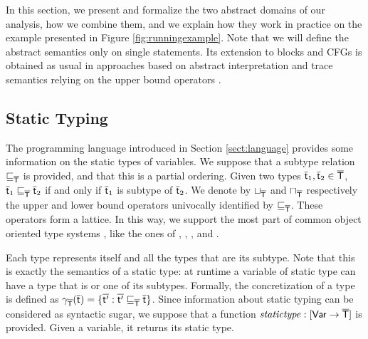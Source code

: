 \documentclass{llncs}
\begin{document}
In this section, we present and formalize the two abstract domains of our analysis, how we combine them, and we explain how they work in practice on the example presented in Figure \ref{fig:runningexample}. Note that we will define the abstract semantics only on single statements. Its extension to blocks and CFGs is obtained as usual in approaches based on abstract interpretation and trace semantics relying on the upper bound operators \cite{CC77}.

\subsection{Static Typing}

The programming language introduced in Section \ref{sect:language} provides some information on the static types of variables. We suppose that a subtype relation $\sqsubseteq_{\mathsf{\overline{T}}}$ is provided, and that this is a partial ordering. Given two types $\mathsf{\overline{t}}_1, \mathsf{\overline{t}}_2 \in \mathsf{\overline{T}}$, $\mathsf{\overline{t}}_1 \sqsubseteq_{\mathsf{\overline{T}}} \mathsf{\overline{t}}_2$ if and only if $\mathsf{\overline{t}}_1$ is subtype of $\mathsf{\overline{t}}_2$. We denote by $\sqcup_{\mathsf{\overline{T}}}$ and $\sqcap_{\mathsf{\overline{T}}}$ respectively the upper and lower bound operators univocally identified by $\sqsubseteq_{\mathsf{\overline{T}}}$. These operators form a lattice. In this way, we support the most part of common object oriented type systems \cite{CAR04}, like the ones of \Java, \CSharp, \Scala, and \FSharp.

Each type represents itself and all the types that are its subtype. Note that this is exactly the semantics of a static type: at runtime a variable of static type  can have a type that is  or one of its subtypes. Formally, the concretization of a type  is defined as $\gamma_{\mathsf{\overline{T}}}(\mathsf{\overline{t}})=\{\mathsf{\overline{t'}} : \mathsf{\overline{t'}} \sqsubseteq_{\mathsf{\overline{T}}} \mathsf{\overline{t}}\}$. Since information about static typing can be considered as syntactic sugar, we suppose that a function $\mathit{statictype} : [\mathsf{Var} \rightarrow\mathsf{\overline{T}}]$ is provided. Given a variable, it returns its static type.
\end{document}
